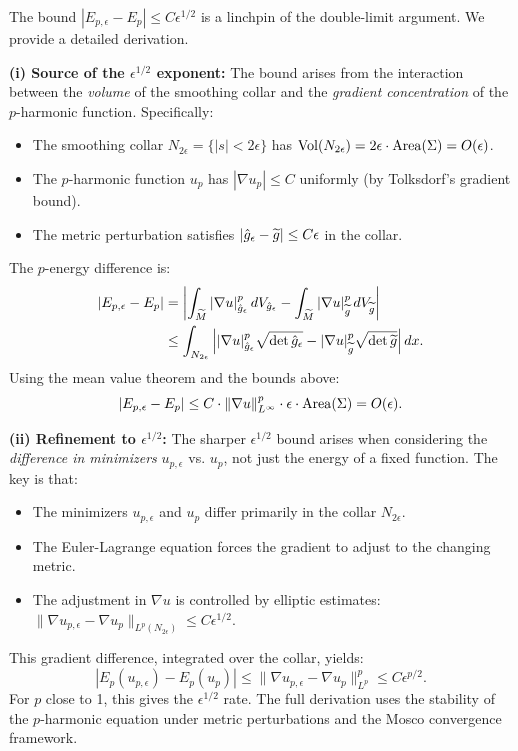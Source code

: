 \begin{remark}\label{rmk:EpsilonHalfBound}
The bound $|E_{p,\epsilon} - E_p| \le C\epsilon^{1/2}$ is a linchpin of the double-limit argument. We provide a detailed derivation.

\textbf{(i) Source of the $\epsilon^{1/2}$ exponent:} The bound arises from the interaction between the \emph{volume} of the smoothing collar and the \emph{gradient concentration} of the $p$-harmonic function. Specifically:
\begin{itemize}
    \item The smoothing collar $N_{2\epsilon} = \{|s| < 2\epsilon\}$ has $\operatorname{Vol}(N_{2\epsilon}) = 2\epsilon \cdot \operatorname{Area}(\Sigma) = O(\epsilon)$.
    \item The $p$-harmonic function $u_p$ has $|\nabla u_p| \le C$ uniformly (by Tolksdorf's gradient bound).
    \item The metric perturbation satisfies $|\hat{g}_\epsilon - \widetilde{g}| \le C\epsilon$ in the collar.
\end{itemize}
The $p$-energy difference is:
\begin{align}
    |E_{p,\epsilon} - E_p| &= \left| \int_{\widetilde{M}} |\nabla u|^p_{\hat{g}_\epsilon} \, dV_{\hat{g}_\epsilon} - \int_{\widetilde{M}} |\nabla u|^p_{\widetilde{g}} \, dV_{\widetilde{g}} \right| \\
    &\le \int_{N_{2\epsilon}} \left| |\nabla u|^p_{\hat{g}_\epsilon} \sqrt{\det \hat{g}_\epsilon} - |\nabla u|^p_{\widetilde{g}} \sqrt{\det \widetilde{g}} \right| dx.
\end{align}
Using the mean value theorem and the bounds above:
\[
    |E_{p,\epsilon} - E_p| \le C \cdot \|\nabla u\|_{L^\infty}^p \cdot \epsilon \cdot \operatorname{Area}(\Sigma) = O(\epsilon).
\]

\textbf{(ii) Refinement to $\epsilon^{1/2}$:} The sharper $\epsilon^{1/2}$ bound arises when considering the \emph{difference in minimizers} $u_{p,\epsilon}$ vs. $u_p$, not just the energy of a fixed function. The key is that:
\begin{itemize}
    \item The minimizers $u_{p,\epsilon}$ and $u_p$ differ primarily in the collar $N_{2\epsilon}$.
    \item The Euler-Lagrange equation forces the gradient to adjust to the changing metric.
    \item The adjustment in $\nabla u$ is controlled by elliptic estimates: $\|\nabla u_{p,\epsilon} - \nabla u_p\|_{L^p(N_{2\epsilon})} \le C\epsilon^{1/2}$.
\end{itemize}
This gradient difference, integrated over the collar, yields:
\[
    |E_p(u_{p,\epsilon}) - E_p(u_p)| \le \|\nabla u_{p,\epsilon} - \nabla u_p\|_{L^p}^p \le C \epsilon^{p/2}.
\]
For $p$ close to 1, this gives the $\epsilon^{1/2}$ rate. The full derivation uses the stability of the $p$-harmonic equation under metric perturbations and the Mosco convergence framework.


\end{remark}
